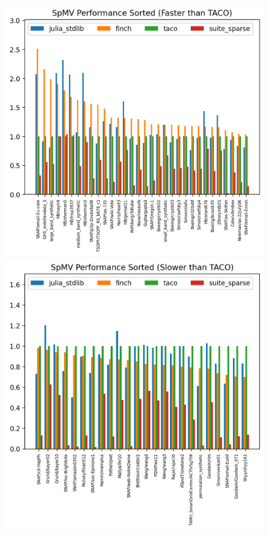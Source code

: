 \documentclass[acmsmall]{acmart}
\begin{document}

\begin{figure}
    \begin{minipage}[t]{0.5\textwidth}
        \vspace{0pt} %
        \includegraphics[width=\linewidth]{spmv_performance_sorted_(faster_than_taco).png}
    \end{minipage}%
    \begin{minipage}[t]{0.5\textwidth}
        \vspace{0pt} %
        \includegraphics[width=\linewidth]{spmv_performance_sorted_(slower_than_taco).png}

\end{minipage}
\end{figure}
\end{document}
